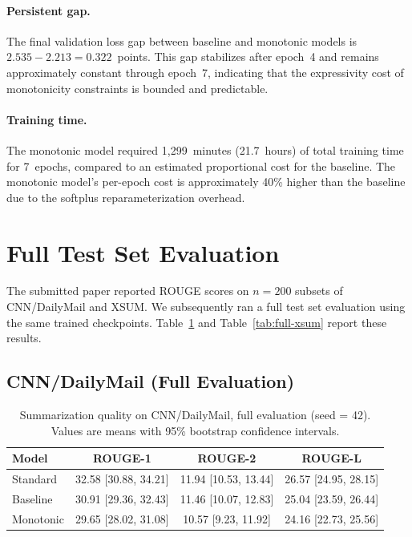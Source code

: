 \documentclass{article}
\begin{document}
\paragraph{Persistent gap.} The final validation loss gap between baseline and monotonic models is $2.535 - 2.213 = 0.322$~points. This gap stabilizes after epoch~4 and remains approximately constant through epoch~7, indicating that the expressivity cost of monotonicity constraints is bounded and predictable.

\paragraph{Training time.} The monotonic model required 1,299~minutes (21.7~hours) of total training time for 7~epochs, compared to an estimated proportional cost for the baseline. The monotonic model's per-epoch cost is approximately 40\% higher than the baseline due to the softplus reparameterization overhead.


\section{Full Test Set Evaluation}
\label{sec:full-eval}

The submitted paper reported ROUGE scores on $n=200$ subsets of CNN/DailyMail and XSUM. We subsequently ran a full test set evaluation using the same trained checkpoints. Table~\ref{tab:full-cnn} and Table~\ref{tab:full-xsum} report these results.

\subsection{CNN/DailyMail (Full Evaluation)}

\begin{table}[h]
\caption{Summarization quality on CNN/DailyMail, full evaluation (seed = 42). Values are means with 95\% bootstrap confidence intervals.}
\label{tab:full-cnn}
\centering
\begin{tabular}{lccc}
\toprule
Model & ROUGE-1 & ROUGE-2 & ROUGE-L \\
\midrule
Standard  & 32.58 [30.88, 34.21] & 11.94 [10.53, 13.44] & 26.57 [24.95, 28.15] \\
Baseline  & 30.91 [29.36, 32.43] & 11.46 [10.07, 12.83] & 25.04 [23.59, 26.44] \\
Monotonic & 29.65 [28.02, 31.08] & 10.57 [9.23, 11.92] & 24.16 [22.73, 25.56] \\
\bottomrule
\end{tabular}
\end{table}
\end{document}
